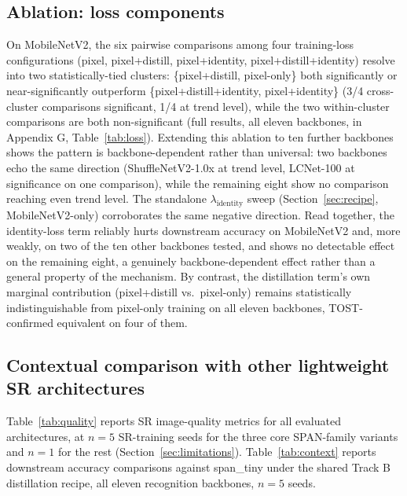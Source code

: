 \documentclass[pdflatex,sn-vancouver-num]{sn-jnl}
\begin{document}
\subsection{Ablation: loss components}
\label{sec:res-loss}

On MobileNetV2, the six pairwise comparisons among four training-loss configurations (pixel, pixel+distill, pixel+identity, pixel+distill+identity) resolve into two statistically-tied clusters: \{pixel+distill, pixel-only\} both significantly or near-significantly outperform \{pixel+distill+identity, pixel+identity\} (3/4 cross-cluster comparisons significant, 1/4 at trend level), while the two within-cluster comparisons are both non-significant (full results, all eleven backbones, in Appendix G, Table~\ref{tab:loss}). Extending this ablation to ten further backbones shows the pattern is backbone-dependent rather than universal: two backbones echo the same direction (ShuffleNetV2-1.0x at trend level, LCNet-100 at significance on one comparison), while the remaining eight show no comparison reaching even trend level. The standalone $\lambda_{\text{identity}}$ sweep (Section~\ref{sec:recipe}, MobileNetV2-only) corroborates the same negative direction. Read together, the identity-loss term reliably hurts downstream accuracy on MobileNetV2 and, more weakly, on two of the ten other backbones tested, and shows no detectable effect on the remaining eight, a genuinely backbone-dependent effect rather than a general property of the mechanism. By contrast, the distillation term's own marginal contribution (pixel+distill vs.\ pixel-only) remains statistically indistinguishable from pixel-only training on all eleven backbones, TOST-confirmed equivalent on four of them.

\subsection{Contextual comparison with other lightweight SR architectures}
\label{sec:res-context}

Table~\ref{tab:quality} reports SR image-quality metrics for all evaluated architectures, at $n=5$ SR-training seeds for the three core SPAN-family variants and $n=1$ for the rest (Section~\ref{sec:limitations}). Table~\ref{tab:context} reports downstream accuracy comparisons against span\_tiny under the shared Track B distillation recipe, all eleven recognition backbones, $n=5$ seeds.
\end{document}
